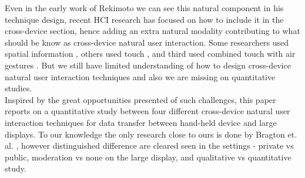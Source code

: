 Even in the early work of Rekimoto we can see this natural component in his technique design, recent HCI research has focused on how to include it in the cross-device section, hence adding an extra natural modality contributing to what should be know as cross-device natural user interaction.  Some researchers used spatial information \cite{Marquardt:2011} \cite{Marquardt:2012}, others used touch \cite{Seifert:2012}, and third used combined touch with air gestures \cite{Bragdon:2011} . But we still have limited understanding of how to design cross-device natural user interaction techniques and also we are missing on quantitative studies.\\

Inspired by the great opportunities presented of such challenges, this paper reports on a quantitative study between four different cross-device natural user interaction techniques for data transfer between hand-held device and large displays. To our knowledge the only research close to ours is done by Bragton et. al. \cite{Bragdon:2011}, however distinguished difference are cleared seen in the settings - private vs public, moderation vs none on the large display, and qualitative vs quantitative study.

